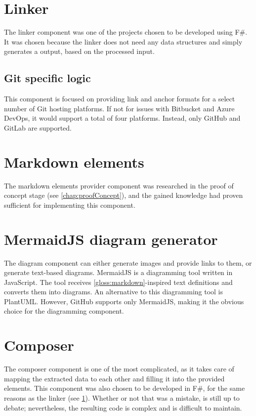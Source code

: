 \section{Linker} \label{sec:linker}

The linker component was one of the projects chosen to be developed using F\#. It was chosen because the linker does not need any data structures and simply generates a output, based on the processed input.

\subsection{Git specific logic}

This component is focused on providing link and anchor formats for a select number of Git hosting platforms. If not for issues with Bitbucket and Azure DevOps, it would support a total of four platforms. Instead, only GitHub and GitLab are supported.

\section{Markdown elements}

The markdown elements provider component was researched in the proof of concept stage (see \ref{chap:proofConcept}), and the gained knowledge had proven sufficient for implementing this component.

\section{MermaidJS diagram generator}

The diagram component can either generate images and provide links to them, or generate text-based diagrams. MermaidJS is a diagramming tool written in JavaScript. The tool receives \ref{gloss:markdown}-inspired text definitions and converts them into diagrams. An alternative to this diagramming tool is PlantUML. However, GitHub supports only MermaidJS, making it the obvious choice for the diagramming component.

\section{Composer}

The composer component is one of the most complicated, as it takes care of mapping the extracted data to each other and filling it into the provided elements. This component was also chosen to be developed in F\#, for the same reasons as the linker (see \ref{sec:linker}). Whether or not that was a mistake, is still up to debate; nevertheless, the resulting code is complex and is difficult to maintain.

